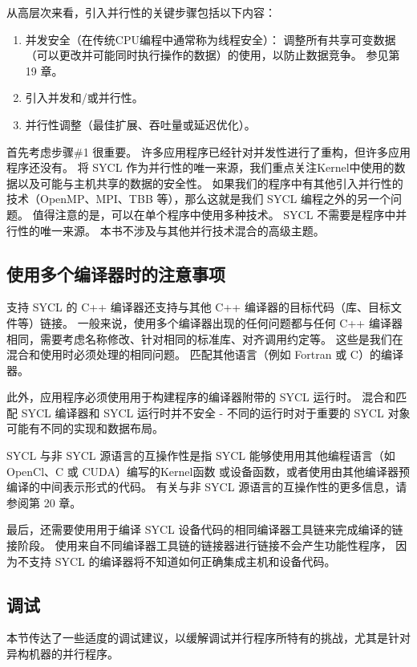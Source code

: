 从高层次来看，引入并行性的关键步骤包括以下内容：

\begin{enumerate}
	\item 并发安全（在传统CPU编程中通常称为线程安全）：
	调整所有共享可变数据（可以更改并可能同时执行操作的数据）的使用，以防止数据竞争。 参见第 19 章。

	\item 引入并发和/或并行性。

	\item 并行性调整（最佳扩展、吞吐量或延迟优化）。
\end{enumerate}

首先考虑步骤\#1 很重要。 许多应用程序已经针对并发性进行了重构，但许多应用程序还没有。 
将 SYCL 作为并行性的唯一来源，我们重点关注Kernel中使用的数据以及可能与主机共享的数据的安全性。 
如果我们的程序中有其他引入并行性的技术（OpenMP、MPI、TBB 等），那么这就是我们 SYCL 编程之外的另一个问题。 
值得注意的是，可以在单个程序中使用多种技术。
SYCL 不需要是程序中并行性的唯一来源。 本书不涉及与其他并行技术混合的高级主题。

\subsection{使用多个编译器时的注意事项}
支持 SYCL 的 C++ 编译器还支持与其他 C++ 编译器的目标代码（库、目标文件等）链接。 
一般来说，使用多个编译器出现的任何问题都与任何 C++ 编译器相同，需要考虑名称修改、针对相同的标准库、对齐调用约定等。
这些是我们在混合和使用时必须处理的相同问题。 匹配其他语言（例如 Fortran 或 C）的编译器。

此外，应用程序必须使用用于构建程序的编译器附带的 SYCL 运行时。 
混合和匹配 SYCL 编译器和 SYCL 运行时并不安全 - 不同的运行时对于重要的 SYCL 对象可能有不同的实现和数据布局。

\begin{remark}
	SYCL 与非 SYCL 源语言的互操作性是指 SYCL 能够使用用其他编程语言（如 OpenCl、C 或 CUDA）编写的Kernel函数
	或设备函数，或者使用由其他编译器预编译的中间表示形式的代码。
	有关与非 SYCL 源语言的互操作性的更多信息，请参阅第 20 章。
\end{remark}

最后，还需要使用用于编译 SYCL 设备代码的相同编译器工具链来完成编译的链接阶段。 
使用来自不同编译器工具链的链接器进行链接不会产生功能性程序，
因为不支持 SYCL 的编译器将不知道如何正确集成主机和设备代码。

\subsection{调试}
本节传达了一些适度的调试建议，以缓解调试并行程序所特有的挑战，尤其是针对异构机器的并行程序。

